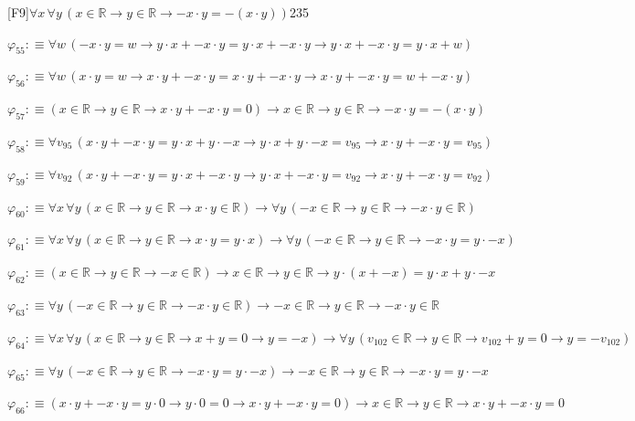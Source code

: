 \begin{fullproof}{[F9]}{$\forall x\,\forall y\,(x \in \mathbb{R} \to y \in \mathbb{R} \to -x \cdot y = -(x \cdot y))$}{235}
\begin{abbrevlist}
\item $\varphi_{55} :\equiv \forall w\,(-x \cdot y = w \to y \cdot x + -x \cdot y = y \cdot x + -x \cdot y \to y \cdot x + -x \cdot y = y \cdot x + w)$
\item $\varphi_{56} :\equiv \forall w\,(x \cdot y = w \to x \cdot y + -x \cdot y = x \cdot y + -x \cdot y \to x \cdot y + -x \cdot y = w + -x \cdot y)$
\item $\varphi_{57} :\equiv (x \in \mathbb{R} \to y \in \mathbb{R} \to x \cdot y + -x \cdot y = 0) \to x \in \mathbb{R} \to y \in \mathbb{R} \to -x \cdot y = -(x \cdot y)$
\item $\varphi_{58} :\equiv \forall v_{95}\,(x \cdot y + -x \cdot y = y \cdot x + y \cdot -x \to y \cdot x + y \cdot -x = v_{95} \to x \cdot y + -x \cdot y = v_{95})$
\item $\varphi_{59} :\equiv \forall v_{92}\,(x \cdot y + -x \cdot y = y \cdot x + -x \cdot y \to y \cdot x + -x \cdot y = v_{92} \to x \cdot y + -x \cdot y = v_{92})$
\item $\varphi_{60} :\equiv \forall x\,\forall y\,(x \in \mathbb{R} \to y \in \mathbb{R} \to x \cdot y \in \mathbb{R}) \to \forall y\,(-x \in \mathbb{R} \to y \in \mathbb{R} \to -x \cdot y \in \mathbb{R})$
\item $\varphi_{61} :\equiv \forall x\,\forall y\,(x \in \mathbb{R} \to y \in \mathbb{R} \to x \cdot y = y \cdot x) \to \forall y\,(-x \in \mathbb{R} \to y \in \mathbb{R} \to -x \cdot y = y \cdot -x)$
\item $\varphi_{62} :\equiv (x \in \mathbb{R} \to y \in \mathbb{R} \to -x \in \mathbb{R}) \to x \in \mathbb{R} \to y \in \mathbb{R} \to y \cdot (x + -x) = y \cdot x + y \cdot -x$
\item $\varphi_{63} :\equiv \forall y\,(-x \in \mathbb{R} \to y \in \mathbb{R} \to -x \cdot y \in \mathbb{R}) \to -x \in \mathbb{R} \to y \in \mathbb{R} \to -x \cdot y \in \mathbb{R}$
\item $\varphi_{64} :\equiv \forall x\,\forall y\,(x \in \mathbb{R} \to y \in \mathbb{R} \to x + y = 0 \to y = -x) \to \forall y\,(v_{102} \in \mathbb{R} \to y \in \mathbb{R} \to v_{102} + y = 0 \to y = -v_{102})$
\item $\varphi_{65} :\equiv \forall y\,(-x \in \mathbb{R} \to y \in \mathbb{R} \to -x \cdot y = y \cdot -x) \to -x \in \mathbb{R} \to y \in \mathbb{R} \to -x \cdot y = y \cdot -x$
\item $\varphi_{66} :\equiv (x \cdot y + -x \cdot y = y \cdot 0 \to y \cdot 0 = 0 \to x \cdot y + -x \cdot y = 0) \to x \in \mathbb{R} \to y \in \mathbb{R} \to x \cdot y + -x \cdot y = 0$

\end{abbrevlist}
\end{fullproof}
